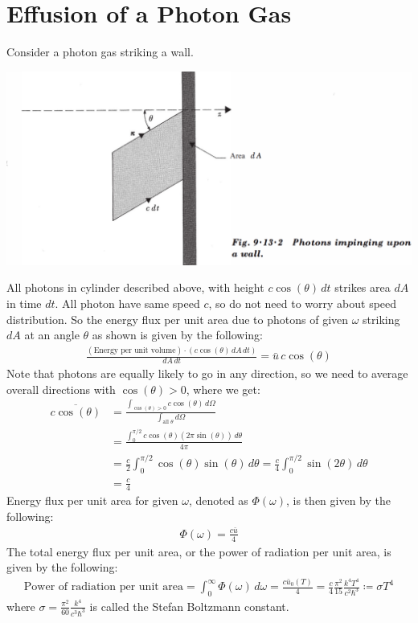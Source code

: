 \documentclass[11pt,oneside]{book}
\theoremstyle{break}
\theoremstyle{break}
\begin{document}
\newpage
\section[Effusion of a Photon Gas]{\color{red}Effusion of a Photon Gas\color{black}}
Consider a photon gas striking a wall.
\begin{center}
\includegraphics[scale=0.35]{photonEffu.png}
\end{center}
All photons in cylinder described above, with height $c \cos(\theta)\, dt$ strikes area $dA$ in time $dt$. All photon have same speed $c$, so do not need to worry about speed distribution. So the energy flux per unit area due to photons of given $\omega $ striking $dA$ at an angle $\theta$ as shown is given by the following:
\begin{align*}
\frac{(\text{Energy per unit volume})\cdot (c\cos(\theta) \, dA \, dt)}{dA\, dt} =\bar{u}\,c \cos(\theta)
\end{align*}
Note that photons are equally likely to go in any direction, so we need to average overall directions with $\cos(\theta) > 0$, where we get:
\begin{align*}
\overline{c\cos(\theta)} &= \frac{\int_{\cos(\theta)>0} c\cos(\theta)\, d\Omega}{\int_{\text{all }\theta} d\Omega} \\
&= \frac{\int_0^{\pi/2} c\cos(\theta) (2\pi \sin(\theta))\, d\theta}{4\pi} \\
&= \frac{c}{2}\int_0^{\pi/2} \cos(\theta)\sin(\theta) \, d\theta = \frac{c}{4}\int_0^{\pi/2} \sin(2\theta)\, d\theta \\
&= \frac{c}{4}
\end{align*}
Energy flux per unit area for given $\omega$, denoted as $\Phi(\omega)$, is then given by the following:
\begin{align*}
\Phi(\omega) = \frac{c\bar{u}}{4} 
\end{align*}
The total energy flux per unit area, or the power of radiation per unit area, is given by the following:
\begin{align*}
\text{Power of radiation per unit area} = \int_0^{\infty }\Phi(\omega)\, d\omega = \frac{c\bar{u}_0(T)}{4} = \frac{c}{4} \frac{\pi^2}{15} \frac{k^4T^4}{c^2 \hbar^3} \coloneqq \sigma T^4
\end{align*}
where $\sigma = \frac{\pi^2}{60}\frac{k^4}{c^3 \hbar^3}$ is called the Stefan Boltzmann constant. \\
\end{document}
